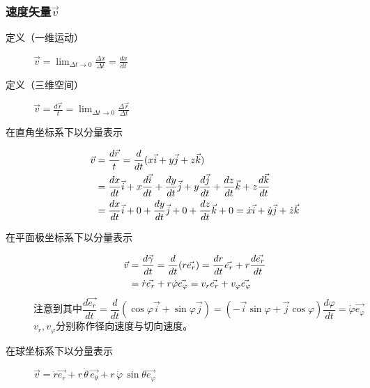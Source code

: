 \subsubsection{速度矢量$\vec{v}$}\begin{description}
\item[定义（一维运动）]
$\vec{v}=\lim_{\varDelta t\to0}\frac{\varDelta x}{\varDelta t}=\frac{dx}{dt}$
\item[定义（三维空间）]
$\vec{v}=\frac{d\vec{r}}{t}=\lim_{\varDelta t\to0}\frac{\varDelta\vec{r}}{\varDelta t}$
\item[在直角坐标系下以分量表示]

\begin{align}
\vec{v}&=\frac{d\vec{r}}{t}=\frac{d}{dt}(x\vec{i}+y\vec{j}+z\vec{k}) \notag \\
&=\frac{dx}{dt}\vec{i}+x\frac{d\vec{i}}{dt}+\frac{dy}{dt}\vec{j}+y\frac{d\vec{j}}{dt}+\frac{dz}{dt}\vec{k}+z\frac{d\vec{k}}{dt} \notag \\
&=\frac{dx}{dt}\vec{i}+0+\frac{dy}{dt}\vec{j}+0+\frac{dz}{dt}\vec{k}+0=\dot{x}\vec{i}+\dot{y}\vec{j}+\dot{z}\vec{k} \notag
\end{align}

\item[在平面极坐标系下以分量表示]
\begin{align}
\vec{v} &= \frac{d\vec{\gamma}}{dt} = \frac{d}{dt}(r\vec{e_r}) =\frac{dr}{dt}\vec{e_r}+r\frac{d\vec{e_r}}{dt} \notag \\
&=\dot{r}\vec{e_r}+r\dot{\varphi}\vec{e_\varphi} =v_r\vec{e_r}+v_\varphi\vec{e_\varphi} \notag
\end{align}
\[\text{注意到其中}\frac{d\vec{e_r}}{dt} = \frac{d}{dt} (\cos\varphi \vec{i}+\sin\varphi\vec{j})=(-\vec{i}\sin\varphi+\vec{j}\cos\varphi)\frac{d\varphi}{dt} = \dot{\varphi}\vec{e_\varphi}\]
$v_r,v_\varphi$分别称作径向速度与切向速度。
\item[在球坐标系下以分量表示]
$\vec{v} = \dot{r} \vec{e_r} + r\,\dot\theta\,\vec{e_\theta} + r\,\dot\varphi\,\sin\theta \vec{e_\varphi} $
\end{description}

